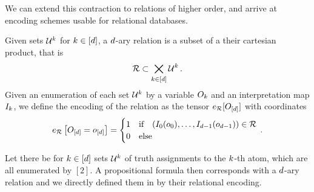 
We can extend this contraction to relations of higher order, and arrive at encoding schemes usable for relational databases.

\begin{definition}
    \label{def:daryRelation}
    Given sets $\mathcal{U}^{k}$ for $k\in[d]$, a $d$-ary relation is a subset of a their cartesian product, that is
    \begin{align*}
        \mathcal{R} \subset\bigtimes_{k\in[d]} \mathcal{U}^{k} \, .
    \end{align*}
    Given an enumeration of each set $\mathcal{U}^{k}$ by a variable $O_{k}$ and an interpretation map $I_{k}$, we define the encoding of the relation as the tensor $e_{\mathcal{R}}[O_{[d]}]$ with coordinates
    \begin{align*}
        e_{\mathcal{R}}\left[O_{[d]}=o_{[d]}\right]
        = \begin{cases}
              1 & \text{if} \quad (I_{0}(o_{0}),\ldots,I_{d-1}(o_{d-1})) \in \mathcal{R} \\
              0 & \text{else}
        \end{cases} \, .
    \end{align*}
\end{definition}

Let there be for $k\in[d]$ sets $\mathcal{U}^{k}$ of truth assignments to the $k$-th atom, which are all enumerated by $[2]$.
A propositional formula then corresponds with a $d$-ary relation and we directly defined them in  by their relational encoding.


